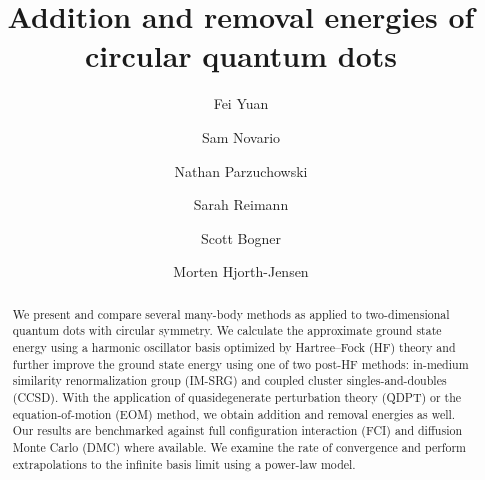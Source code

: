 
\usepackage{amsmath}
\usepackage{amssymb}
\usepackage{bm}
\usepackage{booktabs}
\usepackage{color}
\usepackage{graphicx}
\usepackage{hyperref}
\usepackage{natbib}
\usepackage{siunitx}
\usepackage{subcaption}

\newcommand{\D}{\operatorname{d\!}}
\newcommand{\E}{\operatorname{e}}
\newcommand{\bra}[1]{\langle #1 |}
\newcommand{\braket}[2]{\langle #1 | #2\rangle}
\newcommand{\ket}[1]{| #1 \rangle}
\newcommand{\normord}[1]{\mathopen: #1 \mathclose:}


\title{Addition and removal energies of circular quantum dots}

\author{Fei Yuan}
\author{Sam Novario}
\author{Nathan Parzuchowski}
\author{Sarah Reimann}
\author{Scott Bogner}
\author{Morten Hjorth-Jensen}

\begin{abstract}
  We present and compare several many-body methods as applied to two-dimensional quantum dots with circular symmetry.  We calculate the approximate ground state energy using a harmonic oscillator basis optimized by Hartree--Fock (HF) theory and further improve the ground state energy using one of two post-HF methods: in-medium similarity renormalization group (IM-SRG) and coupled cluster singles-and-doubles (CCSD).  With the application of quasidegenerate perturbation theory (QDPT) or the equation-of-motion (EOM) method, we obtain addition and removal energies as well.  Our results are benchmarked against full configuration interaction (FCI) and diffusion Monte Carlo (DMC) where available.  We examine the rate of convergence and perform extrapolations to the infinite basis limit using a power-law model.
\end{abstract}

